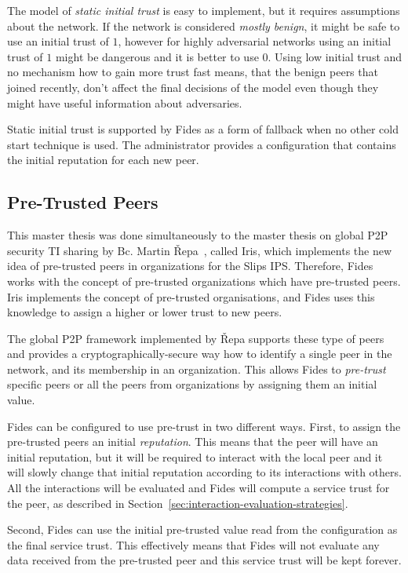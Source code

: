 The model of \textit{static initial trust} is easy to implement, but it requires assumptions about the network. If the network is considered \textit{mostly benign}, it might be safe to use an initial trust of $1$, however for highly adversarial networks using an initial trust of $1$ might be dangerous and it is better to use $0$. 
Using low initial trust and no mechanism how to gain more trust fast means, that the benign peers that joined recently, don't affect the final decisions of the model even though they might have useful information about adversaries.

Static initial trust is supported by Fides as a form of fallback when no other cold start technique is used. The administrator provides a configuration that contains the initial reputation for each new peer.

\subsection{Pre-Trusted Peers}
\label{subsec:pre-trusted-peers}

This master thesis was done simultaneously to the master thesis on global P2P security TI sharing by Bc. Martin Řepa~\cite{nl}, called Iris, which implements the new idea of pre-trusted peers in organizations for the Slips IPS. Therefore, Fides works with the concept of pre-trusted organizations which have pre-trusted peers. Iris implements the concept of pre-trusted organisations, and Fides uses this knowledge to assign a higher or lower trust to new peers.

The global P2P framework implemented by Řepa supports these type of peers and provides a cryptographically-secure way how to identify a single peer in the network, and its membership in an organization.
This allows Fides to \textit{pre-trust} specific peers or all the peers from organizations by assigning them an initial value.

Fides can be configured to use pre-trust in two different ways. First, to assign the pre-trusted peers an initial \textit{reputation}. This means that the peer will have an initial reputation, but it will be required to interact with the local peer and it will slowly change that initial reputation according to its interactions with others. All the interactions will be evaluated and Fides will compute a service trust for the peer, as described in Section~\ref{sec:interaction-evaluation-strategies}. 

Second, Fides can use the initial pre-trusted value read from the configuration as the final service trust. This effectively means that Fides will not evaluate any data received from the pre-trusted peer and this service trust will be kept forever. 

